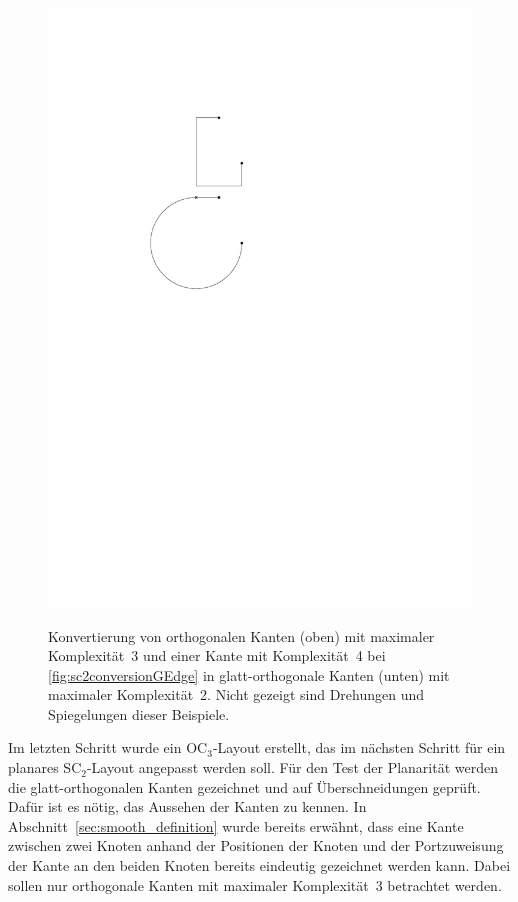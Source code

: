 \documentclass[a4paper]{scrreprt}
\theoremstyle{definition}
\begin{document}
\begin{figure}[h]
            {\includegraphics[scale=.8]{sc2_conversion/GEdge}}
        \quad

        \caption{Konvertierung von orthogonalen Kanten (oben) mit maximaler Komplexität~3 und einer Kante mit Komplexität~4 bei \ref{fig:sc2conversionGEdge} in glatt-orthogonale Kanten (unten) mit maximaler Komplexität~2. Nicht gezeigt sind Drehungen und Spiegelungen dieser Beispiele.}
        \label{fig:sc2conversion}
\end{figure}

Im letzten Schritt wurde ein OC$_3$-Layout erstellt, das im nächsten Schritt für ein planares SC$_2$-Layout angepasst werden soll. Für den Test der Planarität werden die glatt-orthogonalen Kanten gezeichnet und auf Überschneidungen geprüft. Dafür ist es nötig, das Aussehen der Kanten zu kennen. In Abschnitt~\ref{sec:smooth_definition} wurde bereits erwähnt, dass eine Kante zwischen zwei Knoten anhand der Positionen der Knoten und der Portzuweisung der Kante an den beiden Knoten bereits eindeutig gezeichnet werden kann. Dabei sollen nur orthogonale Kanten mit maximaler Komplexität~3 betrachtet werden.
\end{document}
